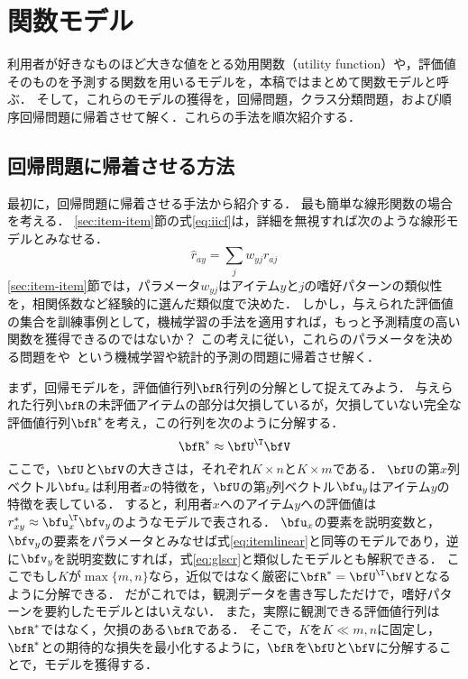 \section{関数モデル}
\label{sec:funcmodel}

利用者が好きなものほど大きな値をとる効用関数（utility function）や，評価値そのものを予測する関数を用いるモデルを，本稿ではまとめて関数モデルと呼ぶ．
そして，これらのモデルの獲得を，回帰問題，クラス分類問題，および順序回帰問題に帰着させて解く．これらの手法を順次紹介する．

\subsection{回帰問題に帰着させる方法}

最初に，回帰問題に帰着させる手法から紹介する．
最も簡単な線形関数の場合を考える．
\ref{sec:item-item}節の式\eqref{eq:iicf}は，詳細を無視すれば次のような線形モデルとみなせる．
\begin{equation}
\hat{r}_{ay} = \sum_j w_{yj} r_{aj}
\label{eq:itemlinear}
\end{equation}
\ref{sec:item-item}節では，パラメータ$w_{yj}$はアイテム$y$と$j$の嗜好パターンの類似性を，相関係数など経験的に選んだ類似度で決めた．
しかし，与えられた評価値の集合を訓練事例として，機械学習の手法を適用すれば，もっと予測精度の高い関数を獲得できるのではないか？
この考えに従い，これらのパラメータを決める問題をや~\cite{e:0028,jpublist:077x}という機械学習や統計的予測の問題に帰着させ解く．

まず，回帰モデルを，評価値行列$\bfR$行列の分解として捉えてみよう．
与えられた行列$\bfR$の未評価アイテムの部分は欠損しているが，欠損していない完全な評価値行列$\bfR^\ast$を考え，この行列を次のように分解する．
\begin{equation}
\bfR^\ast\approx \bfU^\T\bfV
\label{eq:factormodel}
\end{equation}
ここで，$\bfU$と$\bfV$の大きさは，それぞれ$K\times n$と$K\times m$である．
$\bfU$の第$x$列ベクトル$\bfu_x$は利用者$x$の特徴を，$\bfU$の第$y$列ベクトル$\bfu_y$はアイテム$y$の特徴を表している．
すると，利用者$x$へのアイテム$y$への評価値は$r^\ast_{xy} \approx \bfu_x^\T \bfv_y$のようなモデルで表される．
$\bfu_x$の要素を説明変数と，$\bfv_y$の要素をパラメータとみなせば式\eqref{eq:itemlinear}と同等のモデルであり，逆に$\bfv_y$を説明変数にすれば，式\eqref{eq:glscr}と類似したモデルとも解釈できる．
ここでもし$K$が$\max\{m,n\}$なら，近似ではなく厳密に$\bfR^{\ast}=\bfU^\T\bfV$となるように分解できる．
だがこれでは，観測データを書き写しただけで，嗜好パターンを要約したモデルとはいえない．
また，実際に観測できる評価値行列は$\bfR^\ast$ではなく，欠損のある$\bfR$である．
そこで，$K$を$K\ll m,n$に固定し，$\bfR^\ast$との期待的な損失を最小化するように，$\bfR$を$\bfU$と$\bfV$に分解することで，モデルを獲得する．

